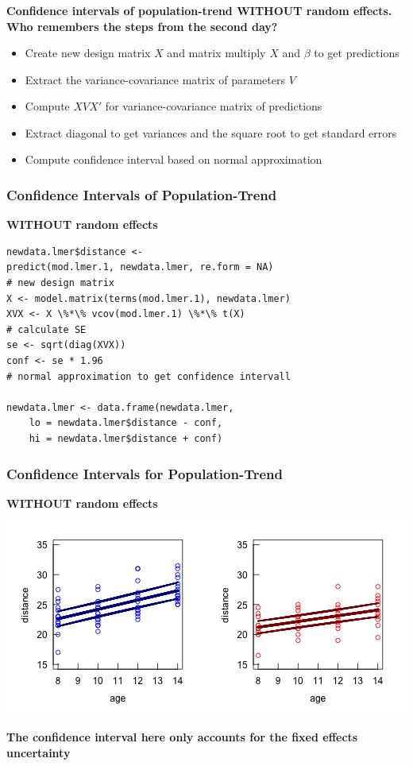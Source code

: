 \documentclass{beamer}
\begin{document}
\begin{frame}
    \frametitle{}
    \textbf{Confidence intervals of population-trend WITHOUT random effects. Who remembers the steps from the second day?}
    \vspace{0.5cm}
    
    \begin{itemize}
        \item Create new design matrix $\mathit{X}$ and matrix multiply $\mathit{X}$ and $\mathit{\beta}$ to get predictions
        \item Extract the variance-covariance matrix of parameters $\mathit{V}$
        \item Compute $\mathit{XV X'}$ for variance-covariance matrix of predictions
        \item Extract diagonal to get variances and the square root to get standard errors
        \item Compute confidence interval based on normal approximation
    \end{itemize}
\end{frame}

\begin{frame}[fragile]
    \frametitle{Confidence Intervals of Population-Trend}
    \textbf{WITHOUT random effects}

    \small\begin{Verbatim}[frame=single]
newdata.lmer$distance <- 
predict(mod.lmer.1, newdata.lmer, re.form = NA)
# new design matrix
X <- model.matrix(terms(mod.lmer.1), newdata.lmer) 
XVX <- X \%*\% vcov(mod.lmer.1) \%*\% t(X) 
# calculate SE
se <- sqrt(diag(XVX)) 
conf <- se * 1.96 
# normal approximation to get confidence intervall

newdata.lmer <- data.frame(newdata.lmer,
    lo = newdata.lmer$distance - conf, 
    hi = newdata.lmer$distance + conf)
    \end{Verbatim}
\end{frame}

\begin{frame}[fragile]
    \frametitle{Confidence Intervals for Population-Trend}
    \textbf{WITHOUT random effects}

    \begin{center}
        \includegraphics[width=\textwidth]{lectures/day_6_praxis_and_fitting_of_mems/figures/unnamed-chunk-28-1.png}
    \end{center}
    
    \textbf{The confidence interval here only accounts for the fixed effects uncertainty}
\end{frame}
\end{document}
